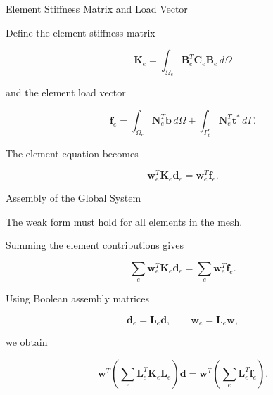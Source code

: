 \documentclass[aspectratio=169]{beamer}
\begin{document}

\begin{frame}{Element Stiffness Matrix and Load Vector}

Define the element stiffness matrix

\[
\boxed{
\mathbf{K}_e
=
\int_{\Omega_e}
\mathbf{B}_e^T
\mathbf{C}_e
\mathbf{B}_e
\, d\Omega
}
\]

and the element load vector

\[
\boxed{
\mathbf{f}_e
=
\int_{\Omega_e}
\mathbf{N}_e^T \mathbf{b}
\, d\Omega
+
\int_{\Gamma_t^e}
\mathbf{N}_e^T \mathbf{t}^*
\, d\Gamma
}.
\]

The element equation becomes

\[
\mathbf{w}_e^T \mathbf{K}_e \mathbf{d}_e
=
\mathbf{w}_e^T \mathbf{f}_e.
\]

\end{frame}

\begin{frame}{Assembly of the Global System}

The weak form must hold for all elements in the mesh.

Summing the element contributions gives

\[
\sum_e
\mathbf{w}_e^T
\mathbf{K}_e
\mathbf{d}_e
=
\sum_e
\mathbf{w}_e^T
\mathbf{f}_e.
\]

Using Boolean assembly matrices

\[
\mathbf{d}_e=\mathbf{L}_e\mathbf{d},
\qquad
\mathbf{w}_e=\mathbf{L}_e\mathbf{w},
\]

we obtain

\[
\mathbf{w}^T
\left(
\sum_e
\mathbf{L}_e^T
\mathbf{K}_e
\mathbf{L}_e
\right)
\mathbf{d}
=
\mathbf{w}^T
\left(
\sum_e
\mathbf{L}_e^T
\mathbf{f}_e
\right).
\]

\end{frame}
\end{document}
